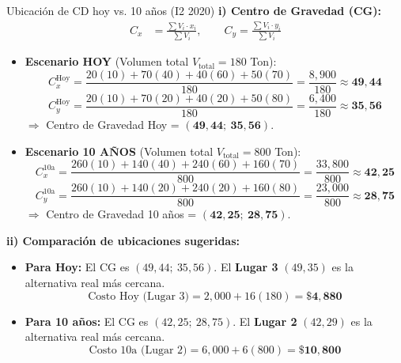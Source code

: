 \begin{ejercicio}{Ubicación de CD hoy vs. 10 años (I2 2020)}
\textbf{i) Centro de Gravedad (CG):}
\begin{align*}
  C_x &= \frac{\sum V_i \cdot x_i}{\sum V_i}, \qquad C_y = \frac{\sum V_i \cdot y_i}{\sum V_i}
\end{align*}

\begin{itemize}[leftmargin=1.4em, itemsep=2pt]
  \item \textbf{Escenario HOY} (Volumen total $V_{\text{total}} = 180$ Ton):
    \[
      C_x^{\text{Hoy}} = \frac{20(10) + 70(40) + 40(60) + 50(70)}{180} = \frac{8{,}900}{180} \approx \mathbf{49{,}44}
    \]
    \[
      C_y^{\text{Hoy}} = \frac{20(10) + 70(20) + 40(20) + 50(80)}{180} = \frac{6{,}400}{180} \approx \mathbf{35{,}56}
    \]
    $\Rightarrow$ Centro de Gravedad Hoy = $\mathbf{(49{,}44;\ 35{,}56)}$.

  \item \textbf{Escenario 10 AÑOS} (Volumen total $V_{\text{total}} = 800$ Ton):
    \[
      C_x^{\text{10a}} = \frac{260(10) + 140(40) + 240(60) + 160(70)}{800} = \frac{33{,}800}{800} \approx \mathbf{42{,}25}
    \]
    \[
      C_y^{\text{10a}} = \frac{260(10) + 140(20) + 240(20) + 160(80)}{800} = \frac{23{,}000}{800} \approx \mathbf{28{,}75}
    \]
    $\Rightarrow$ Centro de Gravedad 10 años = $\mathbf{(42{,}25;\ 28{,}75)}$.
\end{itemize}

\textbf{ii) Comparación de ubicaciones sugeridas:}
\begin{itemize}[leftmargin=1.4em, itemsep=2pt]
  \item \textbf{Para Hoy:} El CG es $(49{,}44;\ 35{,}56)$. El \textbf{Lugar 3} $(49, 35)$ es la alternativa real más cercana.
    \[
      \text{Costo Hoy (Lugar 3)} = 2{,}000 + 16(180) = \mathbf{\$4{,}880}
    \]
  \item \textbf{Para 10 años:} El CG es $(42{,}25;\ 28{,}75)$. El \textbf{Lugar 2} $(42, 29)$ es la alternativa real más cercana.
    \[
      \text{Costo 10a (Lugar 2)} = 6{,}000 + 6(800) = \mathbf{\$10{,}800}
    \]
\end{itemize}


\end{ejercicio}
